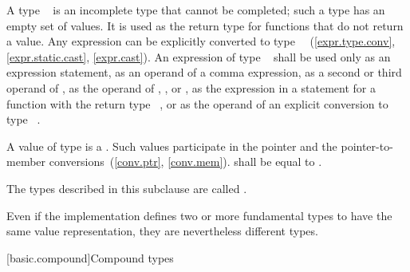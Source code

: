 \pnum
{}%
A type \cv{}~
is an incomplete type that cannot be completed; such a type has
an empty set of values. It is used as the return
type for functions that do not return a value. Any expression can be
explicitly converted to type \cv{}~~(\ref{expr.type.conv},
\ref{expr.static.cast}, \ref{expr.cast}).
An expression of type \cv{}~ shall
be used only as an expression statement, as an operand
of a comma expression, as a second or third operand
of , as the operand of
, , or , as
the expression in a  statement for a function
with the return type \cv{}~, or as the operand of an explicit conversion
to type \cv{}~.

\pnum
A value of type  is a . Such values participate in the pointer and the
pointer-to-member conversions~(\ref{conv.ptr}, \ref{conv.mem}).
 shall be equal to .

\pnum
{}%
The types described in this subclause
are called .
\begin{note}
Even if the implementation defines two or more fundamental types to have the
same value representation, they are nevertheless different types.
\end{note}

[basic.compound]{Compound types}

